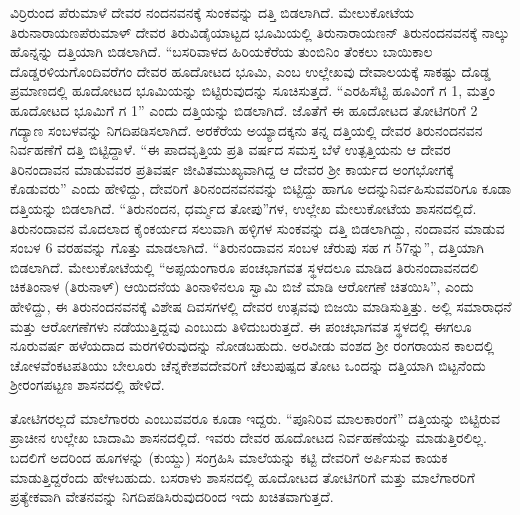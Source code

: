 ವಿರ್ರಿರುಂದ ಪೆರುಮಾಳೆ ದೇವರ ನಂದನವನಕ್ಕೆ ಸುಂಕವನ್ನು ದತ್ತಿ ಬಿಡಲಾಗಿದೆ. ಮೇಲುಕೋಟೆಯ ತಿರು\-ನಾರಾಯಣಪೆರುಮಾಳ್​ ದೇವರ ತಿರುವಿಡೈಯಾಟ್ಟದ ಭೂಮಿಯಲ್ಲಿ ತಿರುನಾರಾಯಣನ್​ ತಿರುನಂದನವನಕ್ಕೆ ನಾಲ್ಕು ಹೊನ್ನನ್ನು ದತ್ತಿಯಾಗಿ ಬಿಡಲಾಗಿದೆ. “ಬಸರಿವಾಳದ ಹಿರಿಯಕೆರೆಯ ತುಂಬಿನಿಂ ತೆಂಕಲು ಬಾಯಿಕಾಲ ದೊಡ್ಡರಳಿಯಗೊಂದಿವ\-ರೆಗಂ ದೇವರ ಹೂದೋಟದ ಭೂಮಿ, ಎಂಬ ಉಲ್ಲೇಖವು ದೇವಾಲಯಕ್ಕೆ ಸಾಕಷ್ಟು ದೊಡ್ಡ ಪ್ರಮಾಣದಲ್ಲಿ ಹೂದೋಟದ ಭೂಮಿಯನ್ನು ಬಿಟ್ಟಿರುವುದನ್ನು ಸೂಚಿಸುತ್ತದೆ. “ಎರಹಿಸೆಟ್ಟಿ ಹೂವಿಂಗೆ ಗ 1, ಮತ್ತಂ ಹೂದೋಟದ ಭೂಮಿಗೆ ಗ 1” ಎಂದು ದತ್ತಿಯನ್ನು ಬಿಡಲಾಗಿದೆ. ಜೊತೆಗೆ ಈ ಹೂದೋಟದ ತೋಟಿಗರಿಗೆ 2 ಗದ್ಯಾಣ ಸಂಬಳವನ್ನು ನಿಗದಿಪಡಿಸಲಾಗಿದೆ. ಅರಕೆರೆಯ ಅಯ್ಯಾದಕ್ಕನು ತನ್ನ ದತ್ತಿಯಲ್ಲಿ ದೇವರ ತಿರುನಂದನವನ ನಿರ್ವಹಣೆಗೆ ದತ್ತಿ ಬಿಟ್ಟಿದ್ದಾಳೆ. “ಈ ಪಾದವೃತ್ತಿಯ ಪ್ರತಿ ವರ್ಷದ ಸಮಸ್ತ ಬೆಳೆ ಉತ್ಪತ್ತಿಯನು ಆ ದೇವರ ತಿರಿನಂದಾವನ ಮಾಡುವವರ ಪ್ರತಿವರ್ಷ ಜೀವಿತಮುಖ್ಯವಾಗಿದ್ದ ಆ ದೇವರ ಶ‍್ರೀ ಕಾರ್ಯದ ಅಂಗಭೋಗಕ್ಕೆ ಕೊಡುವರು” ಎಂದು ಹೇಳಿದ್ದು, ದೇವರಿಗೆ ತಿರಿನಂದನವನವನ್ನು ಬಿಟ್ಟಿದ್ದು ಹಾಗೂ ಅದನ್ನು\break ನಿರ್ವಹಿಸುವವರಿಗೂ ಕೂಡಾ ದತ್ತಿಯನ್ನು ಬಿಡಲಾಗಿದೆ. “ತಿರುನಂದನ, ಧರ್ಮ್ಮದ ತೋಪು”ಗಳ, ಉಲ್ಲೇಖ ಮೇಲುಕೋಟೆಯ ಶಾಸನದಲ್ಲಿದೆ. ತಿರುನಂದಾವನ ಮೊದಲಾದ ಕೈಂಕರ್ಯದ ಸಲುವಾಗಿ ಹಳ್ಳಿಗಳ ಸುಂಕವನ್ನು ದತ್ತಿ ಬಿಡಲಾಗಿದ್ದು, ನಂದಾವನ ಮಾಡುವ ಸಂಬಳ 6 ವರಹವನ್ನು ಗೊತ್ತು ಮಾಡಲಾಗಿದೆ. “ತಿರುನಂದಾವನ ಸಂಬಳ ಚೆರುಪು ಸಹ ಗ 57ನ್ನು”, ದತ್ತಿಯಾಗಿ ಬಿಡಲಾಗಿದೆ. ಮೇಲುಕೋಟೆಯಲ್ಲಿ “ಅಪ್ಪಯಂಗಾರೂ ಪಂಚಭಾಗವತ ಸ್ಥಳದಲೂ ಮಾಡಿದ ತಿರುನಂದಾವನದಲಿ ಚಿಕತಿಂನಾಳ (ತಿರುನಾಳ್) ಆಯಿದನೆಯ ತಿಂನಾಳಿನಲೂ ಸ್ವಾಮಿ ಬಿಜೆ ಮಾಡಿ ಆರೋಗಣೆ ಚಿತಯಿಸಿ”, ಎಂದು ಹೇಳಿದ್ದು, ಈ ತಿರುನಂದನವನಕ್ಕೆ ವಿಶೇಷ ದಿವಸಗಳಲ್ಲಿ ದೇವರ ಉತ್ಸವವು ಬಿಜಯಿ ಮಾಡಿಸುತ್ತಿತ್ತು. ಅಲ್ಲಿ ಸಮಾರಾಧನೆ ಮತ್ತು ಆರೋಗಣೆಗಳು ನಡೆಯುತ್ತಿದ್ದವು ಎಂಬುದು ತಿಳಿದುಬರುತ್ತದೆ. ಈ ಪಂಚಭಾಗವತ ಸ್ಥಳದಲ್ಲಿ ಈಗಲೂ ನೂರುವರ್ಷ ಹಳೆಯ\-ದಾದ ಮರಗಳಿರುವುದನ್ನು ನೋಡಬಹುದು. ಅರವೀಡು ವಂಶದ ಶ‍್ರೀ ರಂಗರಾಯನ ಕಾಲದಲ್ಲಿ ಚೋಳವೆಂಕಟ\-ಪತಿಯು ಬೇಲೂರು ಚೆನ್ನಕೇಶವ\-ದೇವರಿಗೆ ಚೆಲುಪುಷ್ಪದ ತೋಟ ಒಂದನ್ನು ದತ್ತಿಯಾಗಿ ಬಿಟ್ಟನೆಂದು ಶ‍್ರೀರಂಗಪಟ್ಟಣ ಶಾಸನದಲ್ಲಿ ಹೇಳಿದೆ.

ತೋಟಿಗರಲ್ಲದೆ ಮಾಲೆಗಾರರು ಎಂಬುವವರೂ ಕೂಡಾ ಇದ್ದರು. “ಪೂನಿರಿವ ಮಾಲಕಾರಂಗೆ” ದತ್ತಿಯನ್ನು ಬಿಟ್ಟಿರುವ ಪ್ರಾಚೀನ ಉಲ್ಲೇಖ ಬಾದಾಮಿ ಶಾಸನದಲ್ಲಿದೆ. ಇವರು ದೇವರ ಹೂದೋಟದ ನಿರ್ವಹಣೆಯನ್ನು ಮಾಡುತ್ತಿರಲಿಲ್ಲ. ಬದಲಿಗೆ ಅದರಿಂದ ಹೂಗಳನ್ನು (ಕುಯ್ದು) ಸಂಗ್ರಹಿಸಿ ಮಾಲೆಯನ್ನು ಕಟ್ಟಿ ದೇವರಿಗೆ ಅರ್ಪಿಸುವ ಕಾಯಕ ಮಾಡುತ್ತಿದ್ದರೆಂದು ಹೇಳಬಹುದು. ಬಸರಾಳು ಶಾಸನದಲ್ಲಿ ಹೂದೋಟದ ತೋಟಿಗರಿಗೆ ಮತ್ತು ಮಾಲೆಗಾರರಿಗೆ ಪ್ರತ್ಯೇಕವಾಗಿ ವೇತನವನ್ನು ನಿಗದಿಪಡಿಸಿರುವುದರಿಂದ ಇದು ಖಚಿತವಾಗುತ್ತದೆ.

